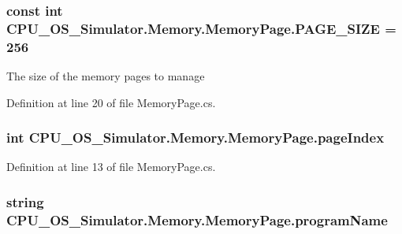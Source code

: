 \subsubsection[{P\+A\+G\+E\+\_\+\+S\+I\+Z\+E}]{\setlength{\rightskip}{0pt plus 5cm}const int C\+P\+U\+\_\+\+O\+S\+\_\+\+Simulator.\+Memory.\+Memory\+Page.\+P\+A\+G\+E\+\_\+\+S\+I\+Z\+E = 256}\label{class_c_p_u___o_s___simulator_1_1_memory_1_1_memory_page_a502abee83030136a808d5b5f0c0fe7ec}


The size of the memory pages to manage 



Definition at line 20 of file Memory\+Page.\+cs.

\hypertarget{class_c_p_u___o_s___simulator_1_1_memory_1_1_memory_page_acf60a7bdefab6120fe080854b5f0b38b}{}
\subsubsection[{page\+Index}]{\setlength{\rightskip}{0pt plus 5cm}int C\+P\+U\+\_\+\+O\+S\+\_\+\+Simulator.\+Memory.\+Memory\+Page.\+page\+Index\hspace{0.3cm}{\ttfamily [private]}}\label{class_c_p_u___o_s___simulator_1_1_memory_1_1_memory_page_acf60a7bdefab6120fe080854b5f0b38b}


Definition at line 13 of file Memory\+Page.\+cs.

\hypertarget{class_c_p_u___o_s___simulator_1_1_memory_1_1_memory_page_a0607c69f1f03e6c8b63186e0b0f13c3c}{}
\subsubsection[{program\+Name}]{\setlength{\rightskip}{0pt plus 5cm}string C\+P\+U\+\_\+\+O\+S\+\_\+\+Simulator.\+Memory.\+Memory\+Page.\+program\+Name\hspace{0.3cm}{\ttfamily [private]}}\label{class_c_p_u___o_s___simulator_1_1_memory_1_1_memory_page_a0607c69f1f03e6c8b63186e0b0f13c3c}


